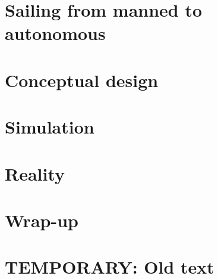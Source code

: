 \documentclass[a4paper,11pt,oneside]{book}
\begin{document}
\frontmatter


\makeCover %

\listoftodos[Notes]
\clearpage





\clearpage
\setcounter{tocdepth}{1}
\tableofcontents
\clearpage

\mainmatter



\part{Sailing from manned to autonomous}



\part{Conceptual design}
%




\part{Simulation}



\part{Reality}




\part{Wrap-up}



\backmatter

\part{TEMPORARY: Old text}






\end{document}

